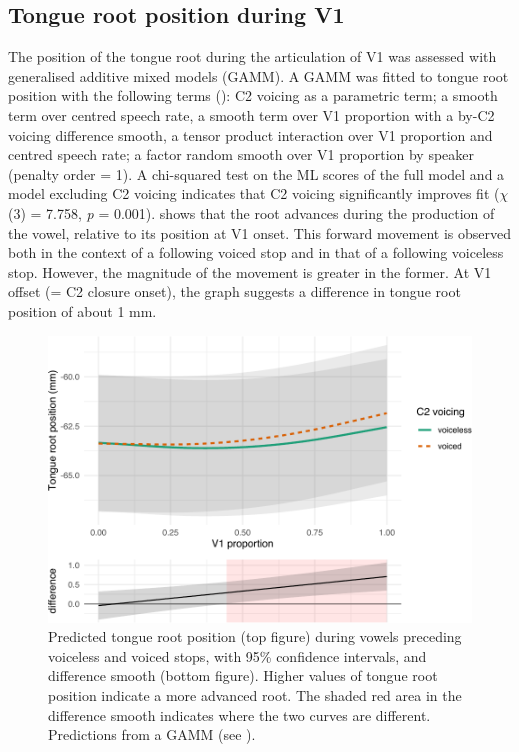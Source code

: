 \documentclass[preprint]{JASAnew}
\begin{document}
\hypertarget{tongue-root-position-during-v1}{%
\subsection{Tongue root position during
V1}\label{tongue-root-position-during-v1}}

\label{s:trp-v1}

The position of the tongue root during the articulation of V1 was
assessed with generalised additive mixed models (GAMM). A GAMM was
fitted to tongue root position with the following terms
(): C2 voicing as a parametric term; a smooth
term over centred speech rate, a smooth term over V1 proportion with a
by-C2 voicing difference smooth, a tensor product interaction over V1
proportion and centred speech rate; a factor random smooth over V1
proportion by speaker (penalty order = 1). A chi-squared test on the ML
scores of the full model and a model excluding C2 voicing indicates that
C2 voicing significantly improves fit (\(\chi\)(3) = 7.758, \emph{p} =
0.001).  shows that the root advances during the
production of the vowel, relative to its position at V1 onset. This
forward movement is observed both in the context of a following voiced
stop and in that of a following voiceless stop. However, the magnitude
of the movement is greater in the former. At V1 offset (= C2 closure
onset), the graph suggests a difference in tongue root position of about
1 mm.

\begin{figure}
\includegraphics[width=\linewidth]{./Figure3-1} \caption{Predicted tongue root position (top figure) during vowels preceding voiceless and voiced stops, with 95\% confidence intervals, and difference smooth (bottom figure). Higher values of tongue root position indicate a more advanced root. The shaded red area in the difference smooth indicates where the two curves are different. Predictions from a GAMM (see ).}\label{f:Figure3}
\end{figure}
\end{document}
